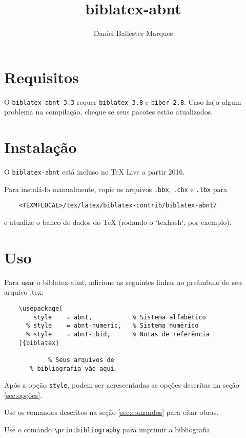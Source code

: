 \documentclass[a4paper]{article}
\title{biblatex-abnt \version}
\author{Daniel Ballester Marques}
\newcommand{\version}{3.3}
\newcommand{\requirements}{\texttt{biblatex 3.8} e \texttt{biber 2.8}}
\begin{document}

\maketitle

\tableofcontents

\clearpage
\section{Requisitos}%

O \texttt{biblatex-abnt \version} requer \requirements. Caso haja algum
problema na compilação, cheque se seus pacotes estão atualizados.

\section{Instalação}%

O \texttt{biblatex-abnt} está incluso no TeX Live a partir 2016.

Para instalá-lo manualmente, copie os arquivos \texttt{.bbx}, \texttt{.cbx} e
\texttt{.lbx} para
\begin{verbatim}
    <TEXMFLOCAL>/tex/latex/biblatex-contrib/biblatex-abnt/
\end{verbatim}
e atualize o banco de dados do TeX (rodando o `texhash`, por exemplo).

\section{Uso}%

Para usar o {biblatex-abnt}, adicione as seguintes linhas ao preâmbulo do seu
arquivo {.tex}:

\begin{verbatim}
    \usepackage[
        style    = abnt,           % Sistema alfabético
      % style    = abnt-numeric,   % Sistema numérico
      % style    = abnt-ibid,      % Notas de referência
    ]{biblatex}

            % Seus arquivos de
       % bibliografia vão aqui.
\end{verbatim}

Após a opção \texttt{style}, podem ser acrescentadas
as opções descritas na seção \ref{sec:opções}.

Use os comandos descritos na seção \ref{sec:comandos} para citar obras.

Use o comando \verb"\printbibliography" para imprimir a bibliografia.
\end{document}
